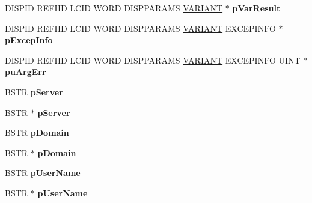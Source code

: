 \begin{DoxyCompactItemize}
D\+I\+S\+P\+ID R\+E\+F\+I\+ID L\+C\+ID W\+O\+RD D\+I\+S\+P\+P\+A\+R\+A\+MS \hyperlink{structtag_v_a_r_i_a_n_t}{V\+A\+R\+I\+A\+NT} $\ast$ {\bfseries p\+Var\+Result}
\item 
\mbox{\label{struct_m_s_t_s_c_lib_1_1_i_ms_tsc_ax_vtbl_a325fa4ec35f4fda74a1ca7550a92f351}} 
D\+I\+S\+P\+ID R\+E\+F\+I\+ID L\+C\+ID W\+O\+RD D\+I\+S\+P\+P\+A\+R\+A\+MS \hyperlink{structtag_v_a_r_i_a_n_t}{V\+A\+R\+I\+A\+NT} E\+X\+C\+E\+P\+I\+N\+FO $\ast$ {\bfseries p\+Excep\+Info}
\item 
\mbox{\label{struct_m_s_t_s_c_lib_1_1_i_ms_tsc_ax_vtbl_ad2527f764fb3201e2f63a3abee785cd4}} 
D\+I\+S\+P\+ID R\+E\+F\+I\+ID L\+C\+ID W\+O\+RD D\+I\+S\+P\+P\+A\+R\+A\+MS \hyperlink{structtag_v_a_r_i_a_n_t}{V\+A\+R\+I\+A\+NT} E\+X\+C\+E\+P\+I\+N\+FO U\+I\+NT $\ast$ {\bfseries pu\+Arg\+Err}
\item 
\mbox{\label{struct_m_s_t_s_c_lib_1_1_i_ms_tsc_ax_vtbl_af4e33e04126f0d7517d06f67ad78b492}} 
B\+S\+TR {\bfseries p\+Server}
\item 
\mbox{\label{struct_m_s_t_s_c_lib_1_1_i_ms_tsc_ax_vtbl_a403b01f138237b4a270bb1623590879d}} 
B\+S\+TR $\ast$ {\bfseries p\+Server}
\item 
\mbox{\label{struct_m_s_t_s_c_lib_1_1_i_ms_tsc_ax_vtbl_a30b2ed613d506221c80792915801ba6d}} 
B\+S\+TR {\bfseries p\+Domain}
\item 
\mbox{\label{struct_m_s_t_s_c_lib_1_1_i_ms_tsc_ax_vtbl_a01afce8c7ea8543887e3470e128006dc}} 
B\+S\+TR $\ast$ {\bfseries p\+Domain}
\item 
\mbox{\label{struct_m_s_t_s_c_lib_1_1_i_ms_tsc_ax_vtbl_a4dbe67e699e28433dae3587cfd535161}} 
B\+S\+TR {\bfseries p\+User\+Name}
\item 
\mbox{\label{struct_m_s_t_s_c_lib_1_1_i_ms_tsc_ax_vtbl_a725cac1def935fc80953999f017a0815}} 
B\+S\+TR $\ast$ {\bfseries p\+User\+Name}
\item 

\end{DoxyCompactItemize}
